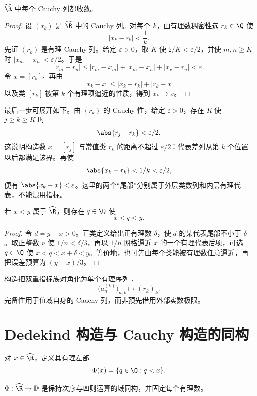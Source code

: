 \begin{theorem}
\(\widehat{\R}\) 中每个 Cauchy 列都收敛。
\end{theorem}

\begin{proof}
设 \((x_k)\) 是 \(\widehat{\R}\) 中的 Cauchy 列。对每个 \(k\)，由有理数稠密性选 \(r_k\in\Q\) 使
\[
 |x_k-r_k|<\frac1k.
\]
先证 \((r_k)\) 是有理 Cauchy 列。给定 \(\varepsilon>0\)，取 \(K\) 使 \(2/K<\varepsilon/2\)，并使 \(m,n\ge K\) 时 \(|x_m-x_n|<\varepsilon/2\)。于是
\[
 |r_m-r_n|\le|r_m-x_m|+|x_m-x_n|+|x_n-r_n|<\varepsilon.
\]
令 \(x=[r_k]\)。再由
\[
 |x_k-x|\le|x_k-r_k|+|r_k-x|
\]
以及类 \([r_k]\) 被第 \(k\) 个有理项逼近的性质，得到 \(x_k\to x\)。
\end{proof}

最后一步可展开如下。由 \((r_k)\) 的 Cauchy 性，给定 \(\varepsilon>0\)，存在 \(K\) 使 \(j\ge k\ge K\) 时
\[
 \abs{r_j-r_k}<\varepsilon/2.
\]
这说明构造数 \(x=[r_j]\) 与常值类 \(r_k\) 的距离不超过 \(\varepsilon/2\)：代表差列从第 \(k\) 个位置以后都满足该界。再使
\[
 \abs{x_k-r_k}<1/k<\varepsilon/2,
\]
便有 \(\abs{x_k-x}<\varepsilon\)。这里的两个“尾部”分别属于外层类数列和内层有理代表，不能混用指标。

\begin{proposition}[构造域中有理数的稠密性]
若 \(x<y\) 属于 \(\widehat{\R}\)，则存在 \(q\in\Q\) 使
\[
 x<q<y.
\]
\end{proposition}

\begin{proof}
令 \(d=y-x>0\)。正类定义给出正有理数 \(\delta\)，使 \(d\) 的某代表尾部不小于 \(\delta\)。取正整数 \(n\) 使 \(1/n<\delta/3\)，再以 \(1/n\) 网格逼近 \(x\) 的一个有理代表后项，可选 \(q\in\Q\) 使 \(x<q<x+\delta<y\)。等价地，也可先由每个类能被有理数任意逼近，再把误差预算为 \((y-x)/3\)。
\end{proof}

构造把双重指标族对角化为单个有理序列：
\[
 \bigl(a_n^{(k)}\bigr)_{n,k}\longmapsto(r_k)_k.
\]
完备性用于值域自身的 Cauchy 列，而非预先借用外部实数极限。

\section{Dedekind 构造与 Cauchy 构造的同构}

对 \(x\in\widehat{\R}\)，定义其有理左部
\[
 \Phi(x)=\{q\in\Q:q<x\}.
\]

\begin{theorem}
\(\Phi:\widehat{\R}\to\mathbb D\) 是保持次序与四则运算的域同构，并固定每个有理数。
\end{theorem}

